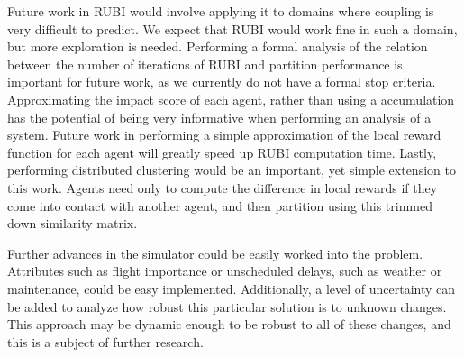 \documentclass[onehalf,11pt]{beavtex}
\begin{document}
Future work in RUBI would involve applying it to domains where coupling is very difficult to predict. We expect that RUBI would work fine in such a domain, but more exploration is needed. Performing a formal analysis of the relation between the number of iterations of RUBI and partition performance is important for future work, as we currently do not have a formal stop criteria. Approximating the impact score of each agent, rather than using a accumulation has the potential of being very informative when performing an analysis of a system. Future work in performing a simple approximation of the local reward function for each agent will greatly speed up RUBI computation time. Lastly, performing distributed clustering would be an important, yet simple extension to this work. Agents need only to compute the difference in local rewards if they come into contact with another agent, and then partition using this trimmed down similarity matrix. 

Further advances in the simulator could be easily worked into the problem. Attributes such as flight importance or unscheduled delays, such as weather or maintenance, could be easy implemented. Additionally, a level of uncertainty can be added to analyze how robust this particular solution is to unknown changes. This approach may be dynamic enough to be robust to all of these changes, and this is a subject of further research.



\end{document}
